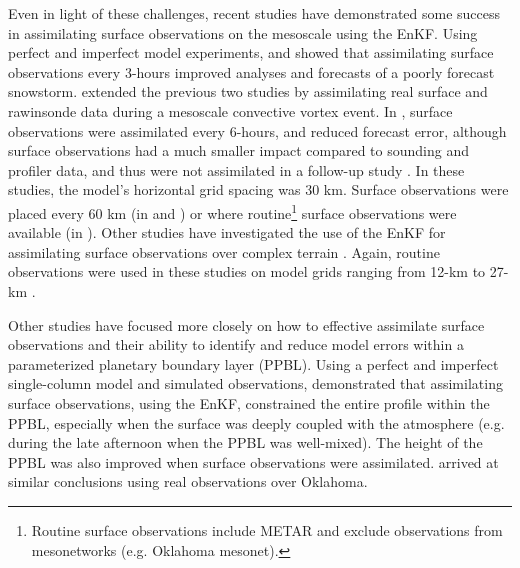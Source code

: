 Even in light of these challenges, recent studies have demonstrated some success in assimilating surface observations on the mesoscale using the EnKF. Using perfect and imperfect model experiments, \citet{zhangetal06a} and \citet{mengzhang07} showed that assimilating surface observations every 3-hours improved analyses and forecasts of a poorly forecast snowstorm. \citet{mengzhang08a} extended the previous two studies by assimilating real surface and rawinsonde data during a mesoscale convective vortex event. In \citet{mengzhang08a}, surface observations were assimilated every 6-hours, and reduced forecast error, although surface observations had a much smaller impact compared to sounding and profiler data, and thus were not assimilated in a follow-up study \citep{mengzhang08b}. In these studies, the model’s horizontal grid spacing was 30 km. Surface observations were placed every 60 km (in \citealt{zhangetal06a} and \citealt{mengzhang07}) or where routine\footnote{Routine surface observations include METAR and exclude observations from mesonetworks (e.g. Oklahoma mesonet).} surface observations were available (in \citealt{mengzhang08a}). Other studies have investigated the use of the EnKF for assimilating surface observations over complex terrain \citep{puetal13,ancelletal11}. Again, routine observations were used in these studies on model grids ranging from 12-km \citep{ancelletal11} to 27-km \citep{puetal13}.

Other studies have focused more closely on how to effective assimilate surface observations and their ability to identify and reduce model errors within a parameterized planetary boundary layer (PPBL). Using a perfect and imperfect single-column model and simulated observations, \citet{hackersnyder05} demonstrated that assimilating surface observations, using the EnKF, constrained the entire profile within the PPBL, especially when the surface was deeply coupled with the atmosphere (e.g. during the late afternoon when the PPBL was well-mixed). The height of the PPBL was also improved when surface observations were assimilated. \citet{hackeredelstein07} arrived at similar conclusions using real observations over Oklahoma.

